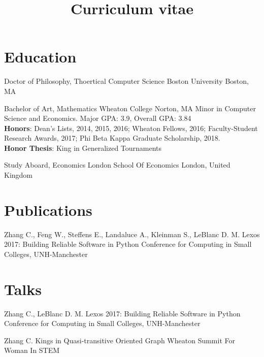 \documentclass[11pt,a4paper,roman]{moderncv}        %
\title{Curriculum vitae}
\begin{document}

\makecvtitle{}

\setlength{\parskip}{2.5px}
\linespread{1.3}
\selectfont


\section{Education}

{Doctor of Philosophy, Thoertical Computer Science}
{Boston University}
{Boston, MA} {}
{}  %

{Bachelor of Art, Mathematics}
{Wheaton College}
{Norton, MA} {}
{Minor in Computer Science and Economics.
Major GPA\@: 3.9, Overall GPA\@: 3.84\\
\textbf{Honors}: Dean's Lists, 2014, 2015, 2016;
Wheaton Fellows, 2016;
Faculty-Student Research Awards, 2017;
Phi Beta Kappa Graduate Scholarship, 2018.\\
\textbf{Honor Thesis}: King in Generalized Tournaments}

{Study Aboard, Economics}
{London School Of Economics}
{London, United Kingdom}{}
{}  %



\section{Publications}

{Zhang C., Feng W., Steffens E., Landaluce A., Kleinman S., LeBlanc D. M.}
{Lexos 2017: Building Reliable Software in Python}
{Conference for Computing in Small Colleges, UNH-Manchester}
{}{}

\section{Talks}

{Zhang C., LeBlanc D. M.}
{Lexos 2017: Building Reliable Software in Python}
{Conference for Computing in Small Colleges, UNH-Manchester}
{}{}

{Zhang C.}
{Kings in Quasi-transitive Oriented Graph}
{Wheaton Summit For Woman In STEM}
{}{}
\end{document}
